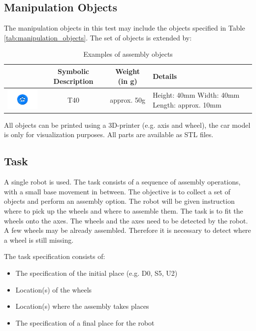 \subsection{Manipulation Objects}
The manipulation objects in this test may include the objects specified in Table \ref{tab:manipulation_objects}.
The set of objects is extended by:

\begin{table}[p]
\begin{tabular}{|c|c|c|p{5cm}|}
\hline 
 & Symbolic Description & Weight (in g) & Details \\ 
\hline 
\includegraphics[width=3cm]{./images/BAT_Tire.png}  & T40 & approx. 50g & Height: 40mm \newline
 Width: 40mm \newline
 Length: approx. 10mm \\ 
\hline 
\end{tabular} 

\label{tab:bat_objects}
\caption{Examples of assembly objects}
\end{table}

All objects can be printed using a 3D-printer (e.g. axis and wheel), the car model is only for visualization purposes. All parts are available as STL files.

\subsection{Task}
A single robot is used. The task consists of a sequence of assembly operations, with a small base movement in between. The objective is to collect a set of objects and perform an assembly option. The robot will be given instruction where to pick up the wheels and where to assemble them. The task is to fit the wheels onto the axes. The wheels and the axes need to be detected by the robot. A few wheels may be already assembled. Therefore it is necessary to detect where a wheel is still missing.

\par
The task specification consists of: 
\begin{itemize}
	\item The specification of the initial place (e.g. D0, S5, U2) 
	\item Location(s) of the wheels
	\item Location(s) where the assembly takes places
	\item The specification of a final place for the robot
\end{itemize}

